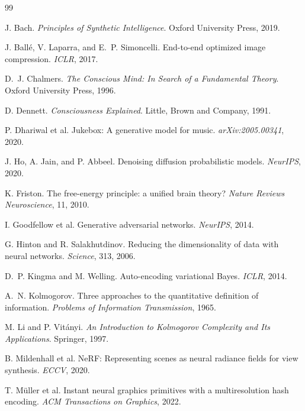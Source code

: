 \documentclass[12pt,a4paper]{article}
\theoremstyle{plain}
\theoremstyle{definition}
\begin{document}
\newpage

\begin{thebibliography}{99}

J. Bach.
\newblock \emph{Principles of Synthetic Intelligence}.
\newblock Oxford University Press, 2019.

J. Ball\'{e}, V. Laparra, and E.~P. Simoncelli.
\newblock End-to-end optimized image compression.
\newblock \emph{ICLR}, 2017.

D.~J. Chalmers.
\newblock \emph{The Conscious Mind: In Search of a Fundamental Theory}.
\newblock Oxford University Press, 1996.

D. Dennett.
\newblock \emph{Consciousness Explained}.
\newblock Little, Brown and Company, 1991.

P. Dhariwal et al.
\newblock Jukebox: A generative model for music.
\newblock \emph{arXiv:2005.00341}, 2020.

J. Ho, A. Jain, and P. Abbeel.
\newblock Denoising diffusion probabilistic models.
\newblock \emph{NeurIPS}, 2020.

K. Friston.
\newblock The free-energy principle: a unified brain theory?
\newblock \emph{Nature Reviews Neuroscience}, 11, 2010.

I. Goodfellow et al.
\newblock Generative adversarial networks.
\newblock \emph{NeurIPS}, 2014.

G. Hinton and R. Salakhutdinov.
\newblock Reducing the dimensionality of data with neural networks.
\newblock \emph{Science}, 313, 2006.

D.~P. Kingma and M. Welling.
\newblock Auto-encoding variational Bayes.
\newblock \emph{ICLR}, 2014.

A.~N. Kolmogorov.
\newblock Three approaches to the quantitative definition of information.
\newblock \emph{Problems of Information Transmission}, 1965.

M. Li and P. Vit\'{a}nyi.
\newblock \emph{An Introduction to Kolmogorov Complexity and Its Applications}.
\newblock Springer, 1997.

B. Mildenhall et al.
\newblock NeRF: Representing scenes as neural radiance fields for view synthesis.
\newblock \emph{ECCV}, 2020.

T. M\"{u}ller et al.
\newblock Instant neural graphics primitives with a multiresolution hash encoding.
\newblock \emph{ACM Transactions on Graphics}, 2022.


\end{thebibliography}
\end{document}

